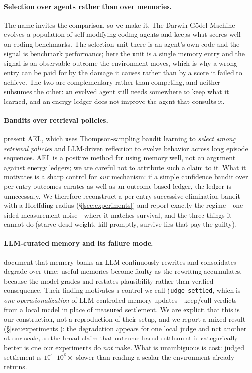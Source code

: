 \paragraph{Selection over agents rather than over memories.}
The name invites the comparison, so we make it. The Darwin G\"{o}del
Machine \citep{zhang2025dgm} evolves a population of self-modifying coding
agents and keeps what scores well on coding benchmarks. The selection unit
there is an agent's own code and the signal is benchmark performance; here
the unit is a single memory entry and the signal is an observable outcome the
environment moves, which is why a wrong entry can be paid for by the damage
it causes rather than by a score it failed to achieve. The two are
complementary rather than competing, and neither subsumes the other: an
evolved agent still needs somewhere to keep what it learned, and an energy
ledger does not improve the agent that consults it.

\paragraph{Bandits over retrieval policies.}
\citet{xu2026ael} present AEL, which uses Thompson-sampling bandit
learning to \emph{select among retrieval policies} and LLM-driven
reflection to evolve behavior across long episode sequences. AEL is a
positive method for using memory well, not an argument against energy
ledgers; we are careful not to attribute such a claim to it. What it
motivates is a sharp control for \emph{our} mechanism: if a simple
confidence bandit over per-entry outcomes curates as well as an outcome-based
ledger, the ledger is unnecessary. We therefore reconstruct a per-entry
successive-elimination bandit with a Hoeffding radius
(\S\ref{sec:experiments}) and report exactly the regime---one-sided
measurement noise---where it matches survival, and the three things it
cannot do (starve dead weight, kill promptly, survive lies that pay the
guilty).

\paragraph{LLM-curated memory and its failure mode.}
\citet{zhang2026faulty} document that memory banks an LLM continuously
rewrites and consolidates degrade over time: useful memories become
faulty as the rewriting accumulates, because the model grades and
restates plausibility rather than verified consequence. Their finding
motivates a control we call \texttt{judge\_settled}, which is \emph{one
operationalization} of LLM-controlled memory updates---keep/cull verdicts
from a local model in place of measured settlement. We are explicit that
this is our construction, not a reproduction of their setup, and we report
a mixed result (\S\ref{sec:experiments}): the degradation appears for one
local judge and not another at our scale, so the broad claim that
outcome-based settlement is categorically better is one our
experiments do \emph{not} make. What is unambiguous is cost: judged
settlement is $10^4$--$10^6\times$ slower than reading a scalar the
environment already returns.

